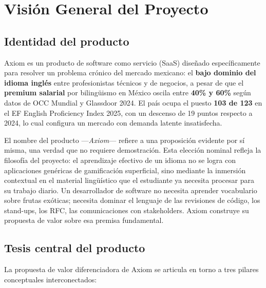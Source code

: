 \documentclass[10pt,a4paper,oneside]{report}
\begin{document}
\chapter{Visión General del Proyecto}

\section{Identidad del producto}
Axiom es un producto de software como servicio (SaaS) diseñado específicamente para resolver un problema crónico del mercado mexicano: el \textbf{bajo dominio del idioma inglés} entre profesionistas técnicos y de negocios, a pesar de que el \textbf{premium salarial} por bilingüismo en México oscila entre \textbf{40\% y 60\%} según datos de OCC Mundial y Glassdoor 2024. El país ocupa el puesto \textbf{103 de 123} en el EF English Proficiency Index 2025, con un descenso de 19 puntos respecto a 2024, lo cual configura un mercado con demanda latente insatisfecha.

El nombre del producto —\textit{Axiom}— refiere a una proposición evidente por sí misma, una verdad que no requiere demostración. Esta elección nominal refleja la filosofía del proyecto: el aprendizaje efectivo de un idioma no se logra con aplicaciones genéricas de gamificación superficial, sino mediante la inmersión contextual en el material lingüístico que el estudiante ya necesita procesar para su trabajo diario. Un desarrollador de software no necesita aprender vocabulario sobre frutas exóticas; necesita dominar el lenguaje de las revisiones de código, los stand-ups, los RFC, las comunicaciones con stakeholders. Axiom construye su propuesta de valor sobre esa premisa fundamental.

\section{Tesis central del producto}
La propuesta de valor diferenciadora de Axiom se articula en torno a tres pilares conceptuales interconectados:
\end{document}

